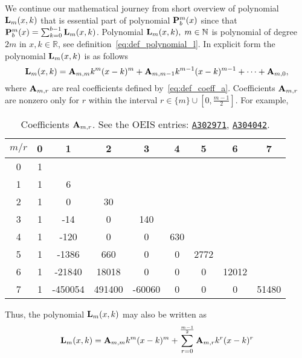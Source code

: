 \label{sec:polynomial-p-and-their-properties}
We continue our mathematical journey from short overview of polynomial ${\mathbf{L}}\sb{m}(x,k)$ that is
essential part of polynomial ${\mathbf{P}}\sp{m} \sb{b}(x)$ since that
${\mathbf{P}}\sp{m} \sb{b}(x) = \sum_{k=0}^{b-1} {\mathbf{L}}\sb{m}(x,k)$.
Polynomial ${\mathbf{L}}\sb{m}(x,k), \; m\in\mathbb{N}$ is polynomial of degree $2m$ in $x,k\in\mathbb{R}$,
see definition~\eqref{eq:def_polynomial_l}.
In explicit form the polynomial ${\mathbf{L}}\sb{m}(x,k)$ is as follows
\begin{equation*}
    {\mathbf{L}}\sb{m}(x,k) =
    {\mathbf{A}} \sb{m,m} k^m(x-k)^m +
    {\mathbf{A}} \sb{m,m-1} k^{m-1}(x-k)^{m-1} +
    \cdots +
    {\mathbf{A}} \sb{m,0},
\end{equation*}
where ${\mathbf{A}} \sb{m,r}$ are real coefficients defined by~\eqref{eq:def_coeff_a}.
Coefficients ${\mathbf{A}} \sb{m,r}$ are nonzero only for $r$ within the interval $r \in \{m\} \cup \left[0,\frac{m-1}{2}\right]$.
For example,
\begin{table}[H]
    \begin{tabular}{c|cccccccc}
        $m/r$ & 0 & 1       & 2      & 3      & 4   & 5    & 6     & 7 \\ [3px]
        \hline
        0     & 1 &         &        &        &     &      &       &       \\
        1     & 1 & 6       &        &        &     &      &       &       \\
        2     & 1 & 0       & 30     &        &     &      &       &       \\
        3     & 1 & -14     & 0      & 140    &     &      &       &       \\
        4     & 1 & -120    & 0      & 0      & 630 &      &       &       \\
        5     & 1 & -1386   & 660    & 0      & 0   & 2772 &       &       \\
        6     & 1 & -21840  & 18018  & 0      & 0   & 0    & 12012 &       \\
        7     & 1 & -450054 & 491400 & -60060 & 0   & 0    & 0     & 51480
    \end{tabular}
    \caption{Coefficients ${\mathbf{A}} \sb{m,r}$. See the OEIS entries:
    \href{https://oeis.org/A302971}{\texttt{A302971}},
        \href{https://oeis.org/A304042}{\texttt{A304042}}.} \label{tab:table_of_coefficients_a}
\end{table}
Thus, the polynomial ${\mathbf{L}}\sb{m}(x,k)$ may also be written as
\begin{equation*}
    {\mathbf{L}}\sb{m}(x,k) = {\mathbf{A}} \sb{m,m} k^m (x-k)^m + \sum_{r=0}^{\frac{m-1}{2}} {\mathbf{A}} \sb{m,r} k^r (x-k)^r
\end{equation*}
